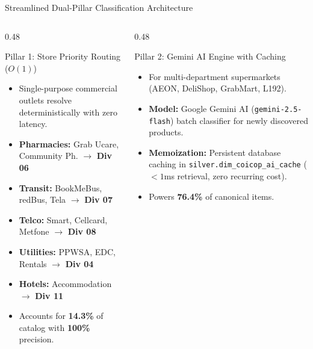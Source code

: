 \documentclass[aspectratio=169, 10pt]{beamer}
\begin{document}
\begin{frame}[shrink=8]{Streamlined Dual-Pillar Classification Architecture}
  \begin{columns}
    \begin{column}{0.48\textwidth}
      \begin{block}{Pillar 1: Store Priority Routing ($O(1)$)}
        \begin{itemize}
          \item Single-purpose commercial outlets resolve deterministically with zero latency.
          \item \textbf{Pharmacies:} Grab Ucare, Community Ph. $\rightarrow$ \textbf{Div 06}
          \item \textbf{Transit:} BookMeBus, redBus, Tela $\rightarrow$ \textbf{Div 07}
          \item \textbf{Telco:} Smart, Cellcard, Metfone $\rightarrow$ \textbf{Div 08}
          \item \textbf{Utilities:} PPWSA, EDC, Rentals $\rightarrow$ \textbf{Div 04}
          \item \textbf{Hotels:} Accommodation $\rightarrow$ \textbf{Div 11}
          \item Accounts for \textbf{14.3\%} of catalog with \textbf{100\%} precision.
        \end{itemize}
      \end{block}
    \end{column}

    \begin{column}{0.48\textwidth}
      \begin{exampleblock}{Pillar 2: Gemini AI Engine with Caching}
        \begin{itemize}
          \item For multi-department supermarkets (AEON, DeliShop, GrabMart, L192).
          \item \textbf{Model:} Google Gemini AI (\texttt{gemini-2.5-flash}) batch classifier for newly discovered products.
          \item \textbf{Memoization:} Persistent database caching in \texttt{silver.dim\_coicop\_ai\_cache} ($<1$ms retrieval, zero recurring cost).
          \item Powers \textbf{76.4\%} of canonical items.
        \end{itemize}
      \end{exampleblock}


\end{column}
\end{columns}
\end{frame}
\end{document}
